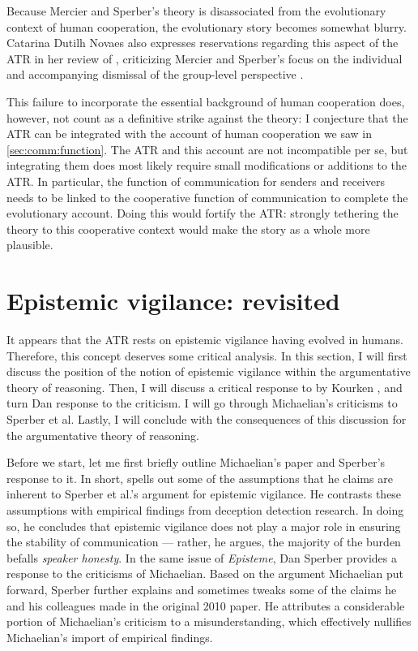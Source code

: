 Because Mercier and Sperber's theory is disassociated from the evolutionary context of human cooperation, the evolutionary story becomes somewhat blurry.
Catarina Dutilh Novaes also expresses reservations regarding this aspect of the ATR in her \citeyear{Novaes18} review of \citet{MS17}, criticizing Mercier and Sperber's focus on the individual and accompanying dismissal of the group-level perspective \citep[\S 3.3]{Novaes18}.

This failure to incorporate the essential background of human cooperation does, however, not count as a definitive strike against the theory: I conjecture that the ATR can be integrated with the account of human cooperation we saw in \cref{sec:comm:function}. The ATR and this account are not incompatible per se, but integrating them does most likely require small modifications or additions to the ATR. In particular, the function of communication for senders and receivers needs to be linked to the cooperative function of communication to complete the evolutionary account.
Doing this would fortify the ATR: strongly tethering the theory to this cooperative context would make the story as a whole more plausible.

\section{Epistemic vigilance: revisited}
\label{sec:EV-scrutiny}

It appears that the ATR rests on epistemic vigilance having evolved in humans. Therefore, this concept deserves some critical analysis.
In this section, I will first discuss the position of the notion of epistemic vigilance within the argumentative theory of reasoning. Then, I will discuss a critical response to \citet{Sperber10} by Kourken \citet{Michaelian13}, and turn Dan  response to the criticism. I will go through Michaelian's criticisms to Sperber et al.
Lastly, I will conclude with the consequences of this discussion for the argumentative theory of reasoning.

Before we start, let me first briefly outline Michaelian's paper and Sperber's response to it. In short, \citeauthor{Michaelian13} spells out some of the assumptions that he claims are inherent to Sperber et al.'s argument for epistemic vigilance. He contrasts these assumptions with empirical findings from deception detection research. In doing so, he concludes that epistemic vigilance does not play a major role in ensuring the stability of communication --- rather, he argues, the majority of the burden befalls \emph{speaker honesty}. In the same \citeyear{Sperber13} issue of \emph{Episteme}, Dan Sperber provides a response to the criticisms of Michaelian. Based on the argument Michaelian put forward, Sperber further explains and sometimes tweaks some of the claims he and his colleagues made in the original 2010 paper. He attributes a considerable portion of Michaelian's criticism to a misunderstanding, which effectively nullifies Michaelian's import of empirical findings.

